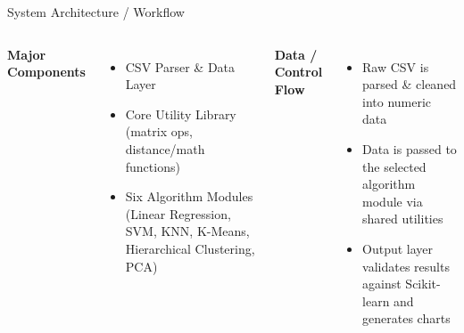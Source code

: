 \documentclass[aspectratio=169,11pt]{beamer}
\begin{document}
\begin{frame}{System Architecture / Workflow}
\begin{center}
\end{center}
\vspace{5mm}
\begin{columns}[T,totalwidth=\textwidth]
\textbf{\color{GEUBlue}Major Components}
\begin{itemize}\itemsep2pt
\item CSV Parser \& Data Layer
\item Core Utility Library (matrix ops, distance/math functions)
\item Six Algorithm Modules (Linear Regression, SVM, KNN, K-Means, Hierarchical Clustering, PCA)
\end{itemize}
\textbf{\color{GEUBlue}Data / Control Flow}
\begin{itemize}\itemsep2pt
\item Raw CSV is parsed \& cleaned into numeric data
\item Data is passed to the selected algorithm module via shared utilities
\item Output layer validates results against Scikit-learn and generates charts
\end{itemize}
\end{columns}
\end{frame}
\end{document}
